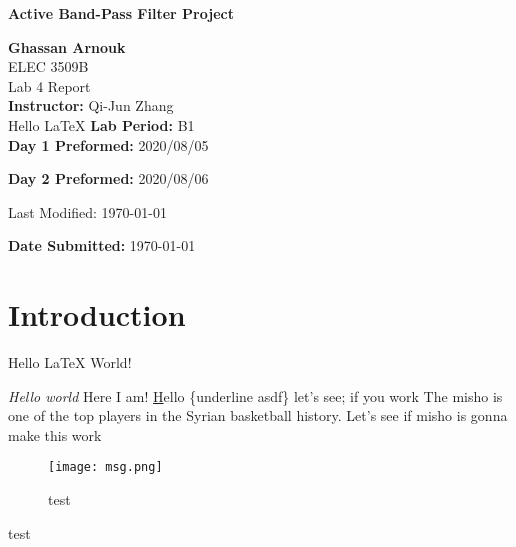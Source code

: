\documentclass[hidelinks]{article}
\begin{document}
	\begin{titlepage}
		\begin{center}
			\vspace{1cm}
			{\LARGE\textbf{Active Band-Pass Filter Project}}
			
			\vspace{1.5cm}
			\textbf{\large Ghassan Arnouk}\\
			
			\vspace{1cm}
			\large ELEC 3509B\\
			\large Lab 4 Report\\
			
			
			\vspace{2cm}
			\textbf{Instructor:} Qi-Jun Zhang\\
			
            Hello \LaTeX			
			\vspace{1cm}
			\textbf{Lab Period:} B1\\
			
			\vspace{0.1cm}
			\textbf{Day 1 Preformed:} 2020/08/05
			
			\vspace{0.1cm}
			\textbf{Day 2 Preformed:} 2020/08/06
		
            Last Modified: \today

			\vspace{1cm}
			\textbf{Date Submitted:} \today\\			
		\end{center}
	\end{titlepage}
	
	\pagebreak
	
	
	
	
	\section{Introduction}
    Hello {\LaTeX} World!

    \emph{Hello world} Here I am!
    \underline Hello \{underline asdf\} let's see; if you work
    The \Gls{misho} is one of the top players in the Syrian basketball history.    
    Let's see if \gls{misho} is gonna make this work

    \clearpage
	\begin{figure}[htbp]
		\centering
		\texttt{[image: msg.png]}
		\caption{test}
		\label{fig:test}
	\end{figure}
	test

    \printglossary
\end{document}
